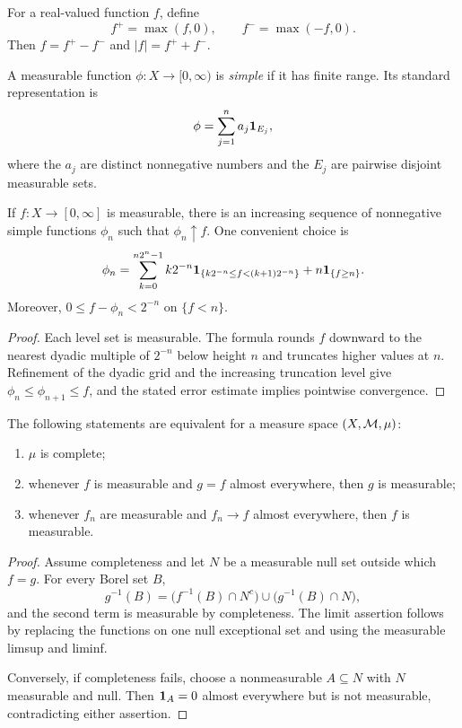 \begin{de}
For a real-valued function $f$, define
\[
f^+=\max(f,0),\qquad f^-=\max(-f,0).
\]
Then $f=f^+-f^-$ and $|f|=f^++f^-$.
\end{de}

\begin{de}
A measurable function $\phi:X\to[0,\infty)$ is \emph{simple} if it has finite range. Its standard representation is
\[
\phi=\sum_{j=1}^na_j\mathbf{1}_{E_j},
\]
where the $a_j$ are distinct nonnegative numbers and the $E_j$ are pairwise disjoint measurable sets.
\end{de}

\begin{thm}
If $f:X\to[0,\infty]$ is measurable, there is an increasing sequence of nonnegative simple functions $\phi_n$ such that $\phi_n\uparrow f$. One convenient choice is
\[
\phi_n
 =\sum_{k=0}^{n2^n-1}k2^{-n}
   \mathbf{1}_{\{k2^{-n}\leq f<(k+1)2^{-n}\}}
   +n\mathbf{1}_{\{f\geq n\}}.
\]
Moreover, $0\leq f-\phi_n<2^{-n}$ on $\{f<n\}$.
\end{thm}

\begin{proof}
Each level set is measurable. The formula rounds $f$ downward to the nearest dyadic multiple of $2^{-n}$ below height $n$ and truncates higher values at $n$. Refinement of the dyadic grid and the increasing truncation level give $\phi_n\leq\phi_{n+1}\leq f$, and the stated error estimate implies pointwise convergence.
\end{proof}

\begin{thm}
The following statements are equivalent for a measure space $(X,\mathcal{M},\mu)$:
\begin{enumerate}
  \item $\mu$ is complete;
  \item whenever $f$ is measurable and $g=f$ almost everywhere, then $g$ is measurable;
  \item whenever $f_n$ are measurable and $f_n\to f$ almost everywhere, then $f$ is measurable.
\end{enumerate}
\end{thm}

\begin{proof}
Assume completeness and let $N$ be a measurable null set outside which $f=g$. For every Borel set $B$,
\[
g^{-1}(B)=\bigl(f^{-1}(B)\cap N^c\bigr)\cup\bigl(g^{-1}(B)\cap N\bigr),
\]
and the second term is measurable by completeness. The limit assertion follows by replacing the functions on one null exceptional set and using the measurable limsup and liminf.

Conversely, if completeness fails, choose a nonmeasurable $A\subseteq N$ with $N$ measurable and null. Then $\mathbf{1}_A=0$ almost everywhere but is not measurable, contradicting either assertion.
\end{proof}

